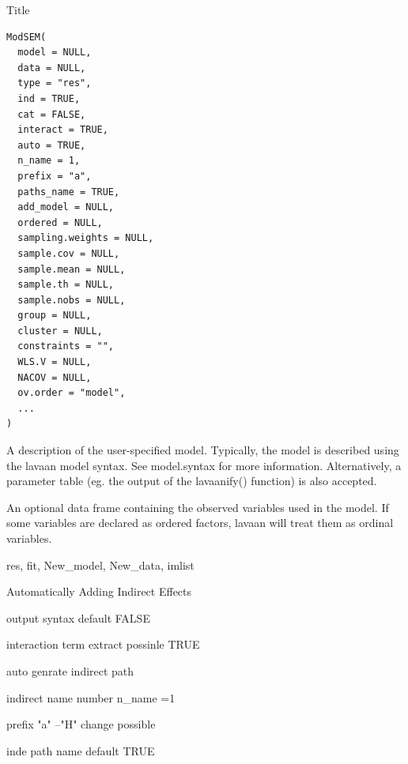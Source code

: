 \documentclass[a4paper]{book}
\begin{document}
%
\begin{Description}
Title
\end{Description}
%
\begin{Usage}
\begin{verbatim}
ModSEM(
  model = NULL,
  data = NULL,
  type = "res",
  ind = TRUE,
  cat = FALSE,
  interact = TRUE,
  auto = TRUE,
  n_name = 1,
  prefix = "a",
  paths_name = TRUE,
  add_model = NULL,
  ordered = NULL,
  sampling.weights = NULL,
  sample.cov = NULL,
  sample.mean = NULL,
  sample.th = NULL,
  sample.nobs = NULL,
  group = NULL,
  cluster = NULL,
  constraints = "",
  WLS.V = NULL,
  NACOV = NULL,
  ov.order = "model",
  ...
)
\end{verbatim}
\end{Usage}
%
\begin{Arguments}
\begin{ldescription}
\item[\code{model}] A description of the user-specified model. Typically, the model is
described using the lavaan model syntax. See model.syntax for more information.
Alternatively, a parameter table (eg. the output of the lavaanify() function)
is also accepted.

\item[\code{data}] An optional data frame containing the observed variables used in the model.
If some variables are declared as ordered factors,
lavaan will treat them as ordinal variables.

\item[\code{type}] res, fit, New\_model, New\_data, imlist

\item[\code{ind}] Automatically Adding Indirect Effects

\item[\code{cat}] output syntax default FALSE

\item[\code{interact}] interaction term extract possinle TRUE

\item[\code{auto}] auto genrate indirect path

\item[\code{n\_name}] indirect name number n\_name =1

\item[\code{prefix}] prefix "a" --"H" change possible

\item[\code{paths\_name}] inde path name default TRUE


\end{ldescription}
\end{Arguments}
\end{document}
